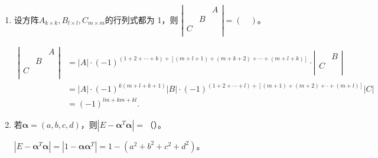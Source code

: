\begin{enumerate}[1~]
\begin{enumerate}[1.~]
\item
设方阵$A _ { k \times k } ,  B _ { l \times l } ,  C _ { m \times m }$的行列式都为 1，则 $\left| \begin{smallmatrix}
	&		&		A\\
	&		B&		\\
	C&		&		\\
\end{smallmatrix} \right|=(\quad)$。

\begin{solution}
\begin{align*}
\left| \begin{matrix}
	&		&		A\\
	&		B&		\\
	C&		&		\\
\end{matrix} \right|
&=|A|\cdot (-1)^{(1+2+\cdots +k)+[(m+l+1)+(m+k+2)+\cdots+(m+l+k)]}\cdot \left| \begin{matrix}
	&		B		\\
	C&		\\
\end{matrix} \right|\\
&=|A|\cdot (-1)^{k(m+l+k+1)}|B|\cdot (-1)^{(1+2+\cdots+l)+[(m+1)+(m+2)+\cdot+(m+l)]}|C|\\
&=(-1)^{lm+km+kl}.
\end{align*}
\end{solution}

\item
若$\boldsymbol{\alpha} = ( a , b , c , d )$，则$\left| E - \boldsymbol{\alpha} ^ { T } \boldsymbol{\alpha} \right| =$（\quad）。
\begin{solution}
$\left| E - \boldsymbol{\alpha} ^ { T } \boldsymbol{\alpha} \right| = |1-\boldsymbol{\alpha} \boldsymbol{\alpha}^T|=1-(a^2+b^2+c^2+d^2)$。
\end{solution}


\end{enumerate}
\end{enumerate}
